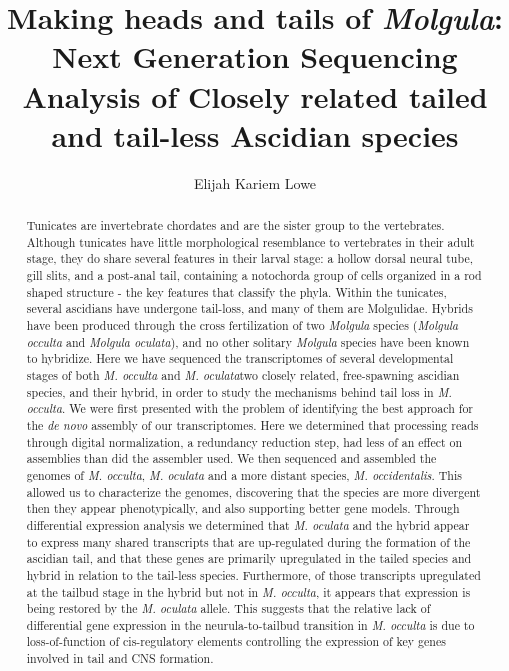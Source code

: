 \documentclass{msuphddissertation}
\author{Elijah Kariem Lowe} %
\title{Making heads and tails of \textit{Molgula}: Next Generation Sequencing Analysis of Closely related tailed and tail-less Ascidian species} %
\begin{document}
\maketitlepage %
\begin{abstract}
Tunicates are invertebrate chordates and are the sister group to the vertebrates. Although tunicates have little morphological resemblance to vertebrates in their adult stage, they do share several features in their larval stage: a hollow dorsal neural tube, gill slits, and a post-anal tail, containing a notochord\textemdash a group of cells organized in a rod shaped structure - the key features that classify the phyla. Within the tunicates, several ascidians have undergone tail-loss, and many of them are Molgulidae. Hybrids have been produced through the cross fertilization of two \textit{Molgula} species (\textit{Molgula occulta} and \textit{Molgula oculata}), and no other solitary \textit{Molgula} species have been known to hybridize. Here we have sequenced the transcriptomes of several developmental stages of both \textit{M. occulta} and \textit{M. oculata}\textemdash two closely related, free-spawning ascidian species, and their hybrid, in order to study the mechanisms behind tail loss in \textit{M. occulta}. We were first presented with the problem of identifying the best approach for the \textit{de novo} assembly of our transcriptomes. Here we determined that processing reads through digital normalization, a redundancy reduction step, had less of an effect on assemblies than did the assembler used. We then sequenced and assembled the genomes of  \textit{M. occulta}, \textit{M. oculata} and a more distant species, \textit{M. occidentalis}. This allowed us to characterize the genomes, discovering that the species are more divergent then they appear phenotypically, and also supporting better gene models. Through differential expression analysis we determined that \textit{M. oculata} and the hybrid appear to express many shared transcripts that are up-regulated during the formation of the ascidian tail, and that these genes are primarily upregulated in the tailed species and hybrid in relation to the tail-less species. Furthermore, of those transcripts upregulated at the tailbud stage in the hybrid but not in \textit{M. occulta}, it appears that expression is being restored by the \textit{M. oculata} allele. This suggests that the relative lack of differential gene expression in the neurula-to-tailbud transition in \textit{M. occulta} is due to loss-of-function of cis-regulatory elements controlling the expression of key genes involved in tail and CNS formation.
\end{abstract}
\end{document}
